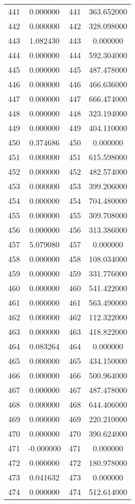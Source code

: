 \documentclass[12pt]{article}
\begin{document}
\begin{longtable}{@{}cccc@{}}
441 & 0.000000 & 441 & 363.652000 \\
442 & 0.000000 & 442 & 328.098000 \\
443 & 1.082430 & 443 & 0.000000 \\
444 & 0.000000 & 444 & 592.304000 \\
445 & 0.000000 & 445 & 487.478000 \\
446 & 0.000000 & 446 & 466.636000 \\
447 & 0.000000 & 447 & 666.474000 \\
448 & 0.000000 & 448 & 323.194000 \\
449 & 0.000000 & 449 & 404.110000 \\
450 & 0.374686 & 450 & 0.000000 \\
451 & 0.000000 & 451 & 615.598000 \\
452 & 0.000000 & 452 & 482.574000 \\
453 & 0.000000 & 453 & 399.206000 \\
454 & 0.000000 & 454 & 704.480000 \\
455 & 0.000000 & 455 & 309.708000 \\
456 & 0.000000 & 456 & 313.386000 \\
457 & 5.079080 & 457 & 0.000000 \\
458 & 0.000000 & 458 & 108.034000 \\
459 & 0.000000 & 459 & 331.776000 \\
460 & 0.000000 & 460 & 541.422000 \\
461 & 0.000000 & 461 & 563.490000 \\
462 & 0.000000 & 462 & 112.322000 \\
463 & 0.000000 & 463 & 418.822000 \\
464 & 0.083264 & 464 & 0.000000 \\
465 & 0.000000 & 465 & 434.150000 \\
466 & 0.000000 & 466 & 500.964000 \\
467 & 0.000000 & 467 & 487.478000 \\
468 & 0.000000 & 468 & 644.406000 \\
469 & 0.000000 & 469 & 220.210000 \\
470 & 0.000000 & 470 & 390.624000 \\
471 & -0.000000 & 471 & 0.000000 \\
472 & 0.000000 & 472 & 180.978000 \\
473 & 0.041632 & 473 & 0.000000 \\
474 & 0.000000 & 474 & 512.614000 \\

\end{longtable}
\end{document}

